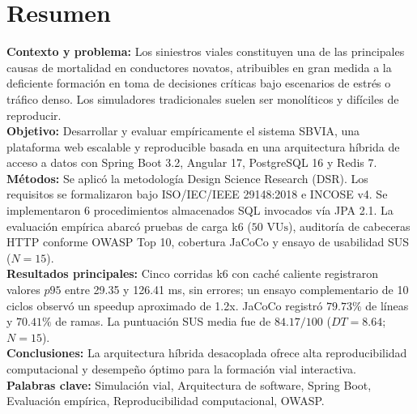 \documentclass[11pt,a4paper]{report}
\begin{document}
\chapter*{Resumen}
\textbf{Contexto y problema:} Los siniestros viales constituyen una de las principales causas de mortalidad en conductores novatos, atribuibles en gran medida a la deficiente formación en toma de decisiones críticas bajo escenarios de estrés o tráfico denso. Los simuladores tradicionales suelen ser monolíticos y difíciles de reproducir. \\
\textbf{Objetivo:} Desarrollar y evaluar empíricamente el sistema SBVIA, una plataforma web escalable y reproducible basada en una arquitectura híbrida de acceso a datos con Spring Boot 3.2, Angular 17, PostgreSQL 16 y Redis 7. \\
\textbf{Métodos:} Se aplicó la metodología Design Science Research (DSR). Los requisitos se formalizaron bajo ISO/IEC/IEEE 29148:2018 e INCOSE v4. Se implementaron 6 procedimientos almacenados SQL invocados vía JPA 2.1. La evaluación empírica abarcó pruebas de carga k6 ($50\text{ VUs}$), auditoría de cabeceras HTTP conforme OWASP Top 10, cobertura JaCoCo y ensayo de usabilidad SUS ($N=15$). \\
\textbf{Resultados principales:} Cinco corridas k6 con caché caliente registraron valores $p95$ entre 29.35 y 126.41 ms, sin errores; un ensayo complementario de 10 ciclos observó un speedup aproximado de 1.2x. JaCoCo registró $79.73\%$ de líneas y $70.41\%$ de ramas. La puntuación SUS media fue de $84.17/100$ ($DT=8.64$; $N=15$). \\
\textbf{Conclusiones:} La arquitectura híbrida desacoplada ofrece alta reproducibilidad computacional y desempeño óptimo para la formación vial interactiva. \\
\textbf{Palabras clave:} Simulación vial, Arquitectura de software, Spring Boot, Evaluación empírica, Reproducibilidad computacional, OWASP.
\end{document}
